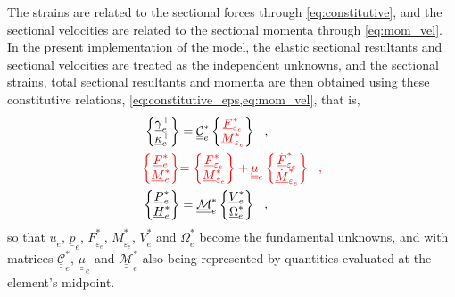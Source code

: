 \documentclass[12pt,a4paper,oneside,english]{abntex2} %
\newcommand{\fix}[1]{{\color{red}#1}}
\newcommand{\vect}[1]{\underline{#1}}
\def\tens#1{\underline{\underline{#1}}}
\def\u{\vect{u}}
\def\gam{\vect{\gamma}}
\def\gamp{\gam^{+}}
\def\kap{\vect{\kappa}}
\def\kapp{\kap^{+}}
\def\V{\vect{V}}
\def\Vs{\V^{*}}
\def\Om{\vect{\Omega}}
\def\Oms{\Om^{*}}
\def\P{\vect{P}}
\def\Ps{\P^*}
\def\Hv{\vect{H}}
\def\Hvs{\Hv^*}
\def\p{\vect{p}}
\def\F{\vect{F}}
\def\Fs{\F^*}
\def\M{\vect{M}}
\def\Ms{\M^*}
\def\ue{\u_e}
\def\pe{\p_e}
\def\Vse{\Vs_e}
\def\Omse{\Oms_e}
\def\gampe{\gamp_e}
\def\kappe{\kapp_e}
\def\Fse{\Fs_e}
\def\Mse{\Ms_e}
\def\Pse{\Ps_e}
\def\Hse{\Hvs_e}
\def\Compliance{\mathcal{\tens{C}}^*}
\def\Compliancee{\Compliance_e}
\def\Fsepse{\F^*_{\varepsilon_e}}
\def\Msepse{\M^*_{\varepsilon_e}}
\def\Fsepsdote{\dot{\F}^*_{\varepsilon_e}}
\def\Msepsdote{\dot{\M}^*_{\varepsilon_e}}
\def\Mass{\mathcal{\tens{M}}^*}
\def\Masse{\Mass_e}
\begin{document}
The strains are related to the sectional forces through \cref{eq:constitutive}, and the sectional velocities are related to the sectional momenta through \cref{eq:mom_vel}. In the present implementation of the model, the \fix{elastic sectional resultants} and sectional velocities are treated as the independent unknowns, and the sectional strains, \fix{total sectional resultants} and momenta are then obtained using these constitutive relations\fix{, \cref{eq:constitutive_eps,eq:mom_vel}}, that is,
\begin{align}
    \begin{Bmatrix}
    \gampe \\ \kappe
    \end{Bmatrix}
    &= \Compliancee
    \begin{Bmatrix}
    \fix{\Fsepse} \\ \fix{\Msepse}
    \end{Bmatrix} \ \ ,
    \label{eq:constitutive_discrete}
    \\
    \fix{\begin{Bmatrix}
    \Fse \\ \Mse
    \end{Bmatrix}}
    &\fix{=
    \begin{Bmatrix}
    \Fsepse \\ \Msepse
    \end{Bmatrix}
    + \tens{\mu}_e
    \begin{Bmatrix}
    \Fsepsdote \\ \Msepsdote
    \end{Bmatrix} \ \ ,}
    \label{eq:total_resultants_discrete}
    \\
    \begin{Bmatrix}
    \Pse \\ \Hse
    \end{Bmatrix}
    &= \Masse
    \begin{Bmatrix}
    \Vse \\ \Omse
    \end{Bmatrix} \ \ ,
    \label{eq:mom_vel_discrete}
\end{align}
so that $\ue$, $\pe$, \fix{$\Fsepse$, $\Msepse$}, $\Vse$ and $\Omse$ become the fundamental unknowns, and with matrices $\Compliancee$\fix{, $\tens{\mu}_e$} and $\Masse$ also being represented by quantities evaluated at the element's midpoint.
\end{document}
